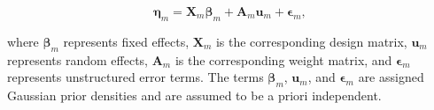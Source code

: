 \begin{equation}
    \boldsymbol{\eta}_m = \mathbf{X}_m \boldsymbol{\beta}_m + \mathbf{A}_m \mathbf{u}_m + \boldsymbol{\epsilon}_m,
\end{equation}

where $\boldsymbol{\beta}_m$ represents fixed effects, $\mathbf{X}_m$ is the corresponding design matrix, $\mathbf{u}_m$ represents random effects, $\mathbf{A}_m$ is the corresponding weight matrix, and $\boldsymbol{\epsilon}_m$ represents unstructured error terms. The terms $\boldsymbol{\beta}_m$, $\mathbf{u}_m$, and $\boldsymbol{\epsilon}_m$ are assigned Gaussian prior densities and are assumed to be a priori independent.
